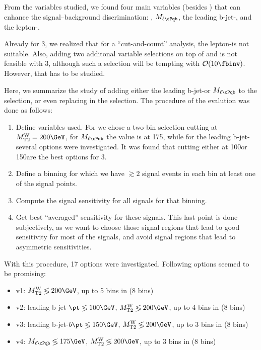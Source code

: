 From the variables studied, we found four main variables (besides \MET) that can enhance the signal--background discrimination: \MTtW, $M_{\ell \cPqb}$, the leading b-jet-\pt, and the lepton-\pt.

Already for 3\fbinv, we realized that for a ``cut-and-count'' analysis, the lepton-\pt is not suitable.
Also, adding two additonal variable selections on top of \MET and \MTtW is not feasible with 3\fbinv, although such a selection will be tempting with $\mathcal{O}(10\fbinv)$. However, that has to be studied.

Here, we summarize the study of adding either the leading b-jet-\pt or $M_{\ell \cPqb}$ to the selection, or even replacing \MTtW in the selection.
The procedure of the evalution was done as follows:
\begin{enumerate}
\item Define variables used. For \MTtW we chose a two-bin selection cutting at $\MTtW=200\GeV$, for $M_{\ell \cPqb}$ the value is at 175\GeV, while for the leading b-jet-\pt several options were investigated. It was found that cutting either at 100\GeV or 150\GeV are the best options for 3\fbinv.
\item Define a \MET binning for which we have $\gtrsim 2$ signal events in each bin at least one of the signal points.
\item Compute the signal sensitivity for all signals for that binning.
\item Get best ``averaged'' sensitivity for these signals. This last point is done subjectively, as we want to choose those signal regions that lead to good sensitivity for most of the signals, and avoid signal regions that lead to asymmetric sensitivities.
\end{enumerate}

With this procedure, 17 options were investigated. Following options seemed to be promising:
\begin{itemize}
\item v1: $\MTtW\lessgtr200\GeV$, up to 5 bins in \MET (8 bins)
\item v2: leading b-jet-$\pt \lessgtr 100\GeV$, $\MTtW\lessgtr200\GeV$, up to 4 bins in \MET (8 bins)
\item v3: leading b-jet-$b\pt \lessgtr 150\GeV$, $\MTtW\lessgtr200\GeV$, up to 3 bins in \MET (8 bins) 
\item v4: $M_{\ell \cPqb} \lessgtr 175\GeV$, $\MTtW\lessgtr200\GeV$, up to 3 bins in \MET (8 bins) 
\end{itemize}

